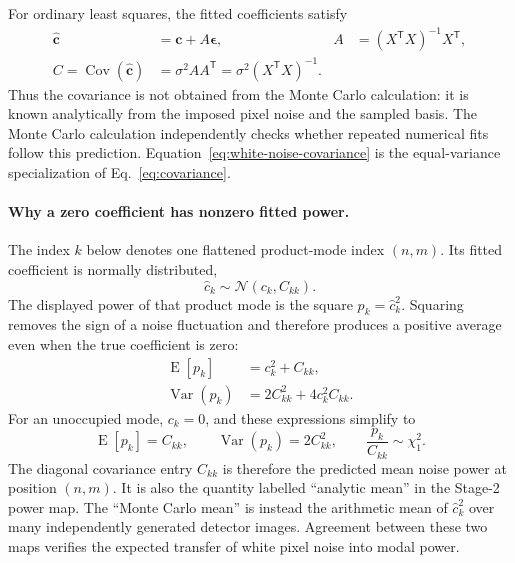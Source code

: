 \documentclass[aps,prb,preprint,onecolumn,notitlepage,amsmath,amssymb,
  superscriptaddress,floatfix]{revtex4-2}
\newcommand{\trans}{\mathsf{T}}
\begin{document}
For ordinary least squares, the fitted coefficients satisfy
\begin{align}
 \widehat{\bm c}
 &=\bm c+A\bm\epsilon,
 &A&=(X^{\trans}X)^{-1}X^{\trans},
 \label{eq:white-noise-response}\\
 C=\operatorname{Cov}(\widehat{\bm c})
 &=\sigma^2AA^{\trans}
 =\sigma^2(X^{\trans}X)^{-1}.
 \label{eq:white-noise-covariance}
\end{align}
Thus the covariance is not obtained from the Monte Carlo calculation: it is
known analytically from the imposed pixel noise and the sampled basis.  The
Monte Carlo calculation independently checks whether repeated numerical fits
follow this prediction.  Equation~\eqref{eq:white-noise-covariance} is the
equal-variance specialization of Eq.~\eqref{eq:covariance}.

\paragraph{Why a zero coefficient has nonzero fitted power.}
The index $k$ below denotes one flattened product-mode index $(n,m)$.  Its
fitted coefficient is normally distributed,
\begin{equation}
 \widehat c_k\sim\mathcal{N}(c_k,C_{kk}).
 \label{eq:white-noise-coefficient}
\end{equation}
The displayed power of that product mode is the square
$p_k=\widehat c_k^2$.  Squaring removes the sign of a noise fluctuation and
therefore produces a positive average even when the true coefficient is zero:
\begin{align}
 \operatorname{E}[p_k]&=c_k^2+C_{kk},
 \label{eq:white-noise-power-mean}\\
 \operatorname{Var}(p_k)&=2C_{kk}^2+4c_k^2C_{kk}.
 \label{eq:white-noise-power-variance}
\end{align}
For an unoccupied mode, $c_k=0$, and these expressions simplify to
\begin{equation}
 \operatorname{E}[p_k]=C_{kk},\qquad
 \operatorname{Var}(p_k)=2C_{kk}^2,\qquad
 \frac{p_k}{C_{kk}}\sim\chi_1^2.
 \label{eq:white-noise-zero-mode}
\end{equation}
The diagonal covariance entry $C_{kk}$ is therefore the predicted mean noise
power at position $(n,m)$.  It is also the quantity labelled ``analytic mean''
in the Stage-2 power map.  The ``Monte Carlo mean'' is instead the arithmetic
mean of $\widehat c_k^2$ over many independently generated detector images.
Agreement between these two maps verifies the expected transfer of white
pixel noise into modal power.
\end{document}
